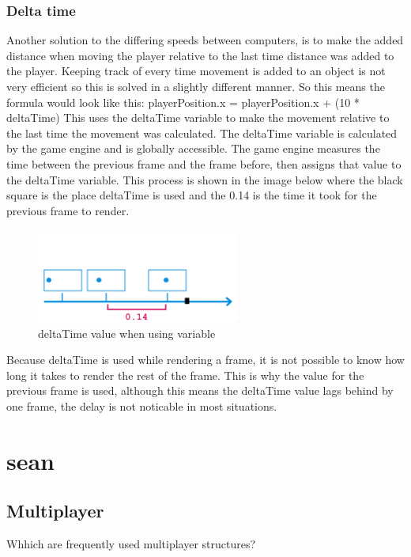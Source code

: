 \documentclass{article} %
\begin{document}
\subsubsection{Delta time}
Another solution to the differing speeds between computers, is to make the added distance when moving the player relative to the last time distance was added to the player.
Keeping track of every time movement is added to an object is not very efficient so this is solved in a slightly different manner.
So this means the formula would look like this:
\newline
playerPosition.x = playerPosition.x + (10 * deltaTime)
\newline
This uses the deltaTime variable to make the movement relative to the last time the movement was calculated.
\newline\newline
The deltaTime variable is calculated by the game engine and is globally accessible.
The game engine measures the time between the previous frame and the frame before, then assigns that value to the deltaTime variable.
This process is shown in the image below where the black square is the place deltaTime is used and the 0.14 is the time it took for the previous frame to render.
\begin{figure}[h!]
    \centering
    \includegraphics[width=0.6\textwidth]{used_deltatime_when_using_variable.png}
    \caption{deltaTime value when using variable}
\end{figure}
\newline
Because deltaTime is used while rendering a frame, it is not possible to know how long it takes to render the rest of the frame.
This is why the value for the previous frame is used, although this means the deltaTime value lags behind by one frame, the delay is not noticable in most situations.

\newpage
\section{sean}
\subsection{Multiplayer}
Whhich are frequently used multiplayer structures?
\end{document}
